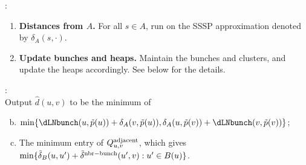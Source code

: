 \noindent{}:
\begin{enumerate}[(1)]
     \item \textbf{Distances from $A$.} For all $s\in A$, run  on the SSSP approximation denoted by $\delta_A(s,\cdot)$. %
    \item \textbf{Update bunches and heaps.} Maintain the bunches and clusters, and update the heaps accordingly. See below for the details.  \label{step:update3}
\end{enumerate}

 \noindent{}:\\
    Output $\hat d(u, v)$ to be the minimum of 
    \begin{enumerate}[(a)]\setcounter{enumi}{1}
         \item $\min\{ \dLNbunch(u,\tilde p(u))+\delta_A(v,\tilde p(u)),\delta_A(u,\tilde p(v))+\dLNbunch(v,\tilde p(v))\}$;\label{step:pivot}
        \item The minimum entry of $Q^{\rm{adjacent}}_{u,v}$, which gives $\min\{\tilde \delta_B(u,u')+\tilde \delta^{\rm{nbr-bunch}}(u',v): u'\in B(u)%
        \}$. \label{step:nbr_light1}
    \end{enumerate}
    



